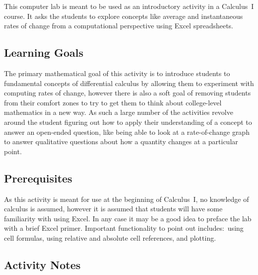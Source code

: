 




\thispagestyle{fancy} %

This computer lab is meant to be used as an introductory activity in a Calculus~I course. It asks the students to explore concepts like average and instantaneous rates of change from a computational perspective using Excel spreadsheets.

\subsection*{Learning Goals}

The primary mathematical goal of this activity is to introduce students to fundamental concepts of differential calculus by allowing them to experiment with computing rates of change, however there is also a soft goal of removing students from their comfort zones to try to get them to think about college-level mathematics in a new way. As such a large number of the activities revolve around the student figuring out how to apply their understanding of a concept to answer an open-ended question, like being able to look at a rate-of-change graph to answer qualitative questions about how a quantity changes at a particular point.

\subsection*{Prerequisites}

As this activity is meant for use at the beginning of Calculus~I, no knowledge of calculus is assumed, however it is assumed that students will have some familiarity with using Excel. In any case it may be a good idea to preface the lab with a brief Excel primer. Important functionality to point out includes:~using cell formulas, using relative and absolute cell references, and plotting.

\subsection*{Activity Notes}

